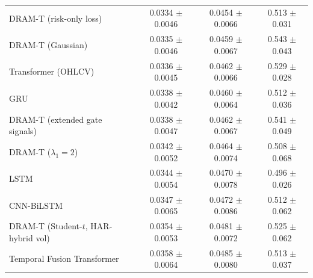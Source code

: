 \begin{table}
\begin{tabular}{lccc}
DRAM-T (risk-only loss) & 0.0334 $\pm$ 0.0046 & 0.0454 $\pm$ 0.0066 & 0.513 $\pm$ 0.031 \\
DRAM-T (Gaussian) & 0.0335 $\pm$ 0.0046 & 0.0459 $\pm$ 0.0067 & 0.543 $\pm$ 0.043 \\
Transformer (OHLCV) & 0.0336 $\pm$ 0.0045 & 0.0462 $\pm$ 0.0066 & 0.529 $\pm$ 0.028 \\
GRU & 0.0338 $\pm$ 0.0042 & 0.0460 $\pm$ 0.0064 & 0.512 $\pm$ 0.036 \\
DRAM-T (extended gate signals) & 0.0338 $\pm$ 0.0047 & 0.0462 $\pm$ 0.0067 & 0.541 $\pm$ 0.049 \\
DRAM-T ($\lambda_1=2$) & 0.0342 $\pm$ 0.0052 & 0.0464 $\pm$ 0.0074 & 0.508 $\pm$ 0.068 \\
LSTM & 0.0344 $\pm$ 0.0054 & 0.0470 $\pm$ 0.0078 & 0.496 $\pm$ 0.026 \\
CNN-BiLSTM & 0.0347 $\pm$ 0.0065 & 0.0472 $\pm$ 0.0086 & 0.512 $\pm$ 0.062 \\
DRAM-T (Student-$t$, HAR-hybrid vol) & 0.0354 $\pm$ 0.0053 & 0.0481 $\pm$ 0.0072 & 0.525 $\pm$ 0.062 \\
Temporal Fusion Transformer & 0.0358 $\pm$ 0.0064 & 0.0485 $\pm$ 0.0080 & 0.513 $\pm$ 0.037 \\
\bottomrule
\end{tabular}
\end{table}

